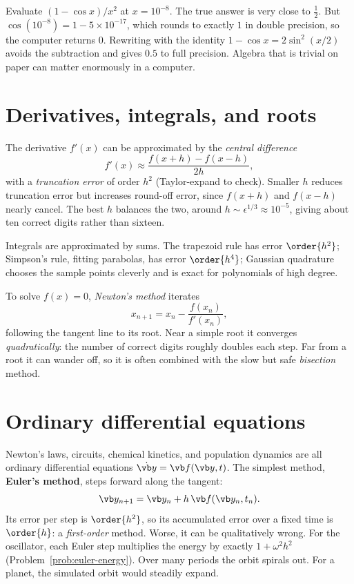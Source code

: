 \begin{example}
Evaluate $(1-\cos x)/x^2$ at $x = 10^{-8}$. The true answer is very close to $\tfrac12$. But $\cos(10^{-8}) = 1 - 5\times10^{-17}$, which rounds to exactly $1$ in double precision, so the computer returns $0$. Rewriting with the identity $1-\cos x = 2\sin^2(x/2)$ avoids the subtraction and gives $0.5$ to full precision. Algebra that is trivial on paper can matter enormously in a computer.
\end{example}

\section{Derivatives, integrals, and roots}

The derivative $f'(x)$ can be approximated by the \emph{central difference}
\[
  f'(x)\approx\frac{f(x+h) - f(x-h)}{2h},
\]
with a \emph{truncation error} of order $h^2$ (Taylor-expand to check). Smaller $h$ reduces truncation error but increases round-off error, since $f(x+h)$ and $f(x-h)$ nearly cancel. The best $h$ balances the two, around $h\sim\epsilon^{1/3}\approx10^{-5}$, giving about ten correct digits rather than sixteen.

Integrals are approximated by sums. The trapezoid rule has error $\order{h^2}$; Simpson's rule, fitting parabolas, has error $\order{h^4}$; Gaussian quadrature chooses the sample points cleverly and is exact for polynomials of high degree.

To solve $f(x)=0$, \emph{Newton's method} iterates
\[
  x_{n+1} = x_n - \frac{f(x_n)}{f'(x_n)},
\]
following the tangent line to its root. Near a simple root it converges \emph{quadratically}: the number of correct digits roughly doubles each step. Far from a root it can wander off, so it is often combined with the slow but safe \emph{bisection} method.

\section{Ordinary differential equations}

Newton's laws, circuits, chemical kinetics, and population dynamics are all ordinary differential equations $\dot{\vb y} = \vb f(\vb y,t)$. The simplest method, \textbf{Euler's method}, steps forward along the tangent:
\[
  \vb y_{n+1} = \vb y_n + h\,\vb f(\vb y_n, t_n).
\]
Its error per step is $\order{h^2}$, so its accumulated error over a fixed time is $\order{h}$: a \emph{first-order} method. Worse, it can be qualitatively wrong. For the oscillator, each Euler step multiplies the energy by exactly $1+\omega^2h^2$ (Problem~\ref{prob:euler-energy}). Over many periods the orbit spirals out. For a planet, the simulated orbit would steadily expand.

